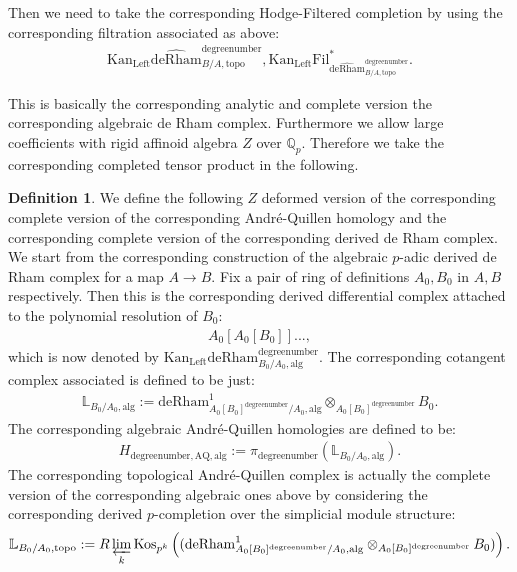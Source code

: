 \documentclass[11pt]{book}
\theoremstyle{definition}
\newtheorem{definition}[theorem]{Definition}
\numberwithin{equation}{section}
\begin{document}
\indent Then we need to take the corresponding Hodge-Filtered completion by using the corresponding filtration associated as above:
\begin{align}
\mathrm{Kan}_\mathrm{Left}\widehat{\mathrm{deRham}}^\text{degreenumber}_{B/A,\mathrm{topo}},\mathrm{Kan}_\mathrm{Left}\mathrm{Fil}^*_{\widehat{\mathrm{deRham}}^\text{degreenumber}_{B/A,\mathrm{topo}}}.	
\end{align}


This is basically the corresponding analytic and complete version the corresponding algebraic de Rham complex. Furthermore we allow large coefficients with rigid affinoid algebra $Z$ over $\mathbb{Q}_p$. Therefore we take the corresponding completed tensor product in the following. 

\begin{definition}
We define the following $Z$ deformed version of the corresponding complete version of the corresponding Andr\'e-Quillen homology and the corresponding complete version of the corresponding derived de Rham complex. We start from the corresponding construction of the algebraic $p$-adic derived de Rham complex for a map $A\rightarrow B$. Fix a pair of ring of definitions $A_0,B_0$ in $A,B$ respectively. Then this is the corresponding derived differential complex attached to the polynomial resolution of $B_0$:
\begin{align}
A_0[A_0[B_0]]...,	
\end{align}
which is now denoted by $\mathrm{Kan}_\mathrm{Left}\mathrm{deRham}^\text{degreenumber}_{B_0/A_0,\mathrm{alg}}$. The corresponding cotangent complex associated is defined to be just:
\begin{align}
\mathbb{L}_{B_0/A_0,\mathrm{alg}}:=	\mathrm{deRham}^1_{A_0[B_0]^\text{degreenumber}/A_0,\mathrm{alg}}\otimes_{A_0[B_0]^\text{degreenumber}} B_0.
\end{align}
The corresponding algebraic Andr\'e-Quillen homologies are defined to be:
\begin{align}
H_{\text{degreenumber},{\mathrm{AQ}},\mathrm{alg}}:=\pi_\text{degreenumber} (\mathbb{L}_{B_0/A_0,\mathrm{alg}}). 	
\end{align}
The corresponding topological Andr\'e-Quillen complex is actually the complete version of the corresponding algebraic ones above by considering the corresponding derived $p$-completion over the simplicial module structure:
\begin{align}
\mathbb{L}_{B_0/A_0,\mathrm{topo}}:=R\varprojlim_k	\mathrm{Kos}_{p^k}\left((\mathrm{deRham}^1_{A_0[B_0]^\text{degreenumber}/A_0,\mathrm{alg}}\otimes_{A_0[B_0]^\text{degreenumber}} B_0)\right).

\end{align}
\end{definition}
\end{document}
